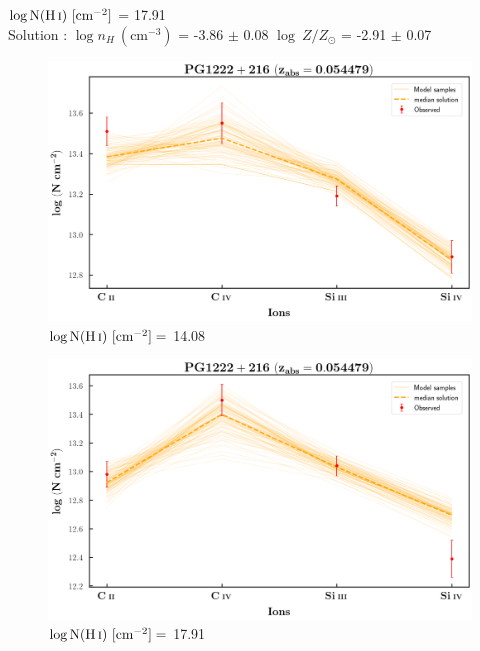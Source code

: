   $\log \text{N}(\ion{H}{i}) \ [\text{cm}^{-2}]$ = 17.91   \\  \hspace*{4mm}
  Solution : $\log n_H \ (\text{cm}^{-3})$ = -3.86 $\pm$ 0.08 \hspace{10mm} $\log \ Z/Z_\odot$ = -2.91 $\pm$ 0.07 \newline  
  
  \newpage
  
  \begin{figure}[!h]
      \centering
      \includegraphics[width=0.9\linewidth]{Ionisation-Modelling-Plots/pg1222-z=0.054479-compI_logZ=-1.png}
      \caption{$\log \text{N}(\ion{H}{i}) \ [\text{cm}^{-2}]=$ 14.08}
  \end{figure}
  
  \begin{figure}[!b]
      \centering
      \includegraphics[width=0.9\linewidth]{Ionisation-Modelling-Plots/pg1222-z=0.054479-compII_logZ=-1.png}
      \caption{$\log \text{N}(\ion{H}{i}) \ [\text{cm}^{-2}]=$ 17.91}
  \end{figure}
  
  
  \newpage
  \thispagestyle{empty}

